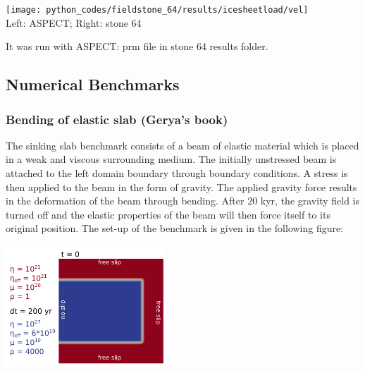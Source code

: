 \begin{center}
\texttt{[image: python\_codes/fieldstone\_64/results/icesheetload/vel]}\\
{\captionfont Left: ASPECT; Right: stone 64} 
\end{center}


It was run with ASPECT: prm file in stone 64 results folder.










\subsection{Numerical Benchmarks}

\subsubsection{Bending of elastic slab (Gerya's book)}

The sinking slab benchmark consists of a beam of elastic material which is placed 
in a weak and viscous surrounding medium. The initially unstressed beam is attached to the left domain boundary through boundary conditions. A stress is then applied to the beam in the form of gravity. The applied gravity force results in the deformation of the beam through bending. After 20 kyr, the gravity field is turned off and the elastic properties of the beam will then force itself to its original position. The set-up of the benchmark is given in the following figure:

\begin{center}
\includegraphics[width=6cm]{images/viscoelasticity/poster_benchmark.png}\\
\end{center}

